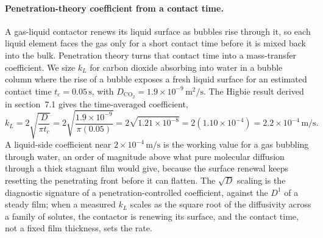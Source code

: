 \paragraph{Penetration-theory coefficient from a contact time.} A
gas-liquid contactor renews its liquid surface as bubbles rise through it,
so each liquid element faces the gas only for a short contact time before
it is mixed back into the bulk. Penetration theory turns that contact time
into a mass-transfer coefficient. We size $k_L$ for carbon dioxide
absorbing into water in a bubble column where the rise of a bubble exposes
a fresh liquid surface for an estimated contact time $t_c = 0.05\,\text{s}$,
with $D_{\text{CO}_2} = 1.9\times 10^{-9}\,\si{\meter\squared\per\second}$.
The Higbie result derived in section~7.1 gives the time-averaged
coefficient,
\[
k_L = 2\sqrt{\frac{D}{\pi t_c}} = 2\sqrt{\frac{1.9\times 10^{-9}}
{\pi(0.05)}} = 2\sqrt{1.21\times 10^{-8}} = 2(1.10\times 10^{-4}) =
2.2\times 10^{-4}\,\text{m/s}.
\]
A liquid-side coefficient near $2\times 10^{-4}\,\text{m/s}$ is the working
value for a gas bubbling through water, an order of magnitude above what
pure molecular diffusion through a thick stagnant film would give, because
the surface renewal keeps resetting the penetrating front before it can
flatten. The $\sqrt{D}$ scaling is the diagnostic signature of a
penetration-controlled coefficient, against the $D^{1}$ of a steady film;
when a measured $k_L$ scales as the square root of the diffusivity across a
family of solutes, the contactor is renewing its surface, and the contact
time, not a fixed film thickness, sets the rate.

